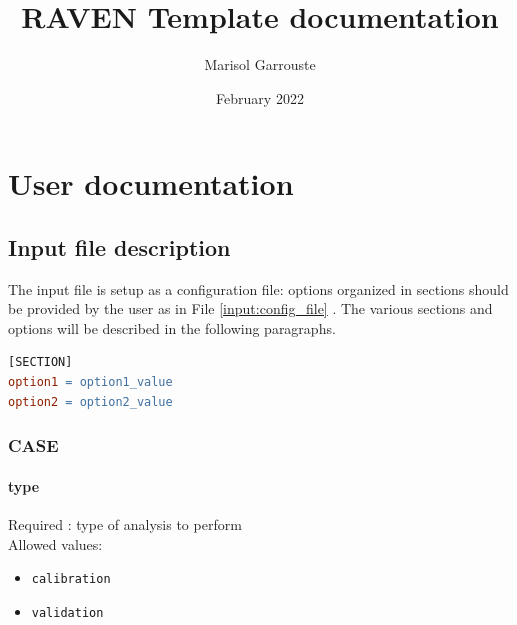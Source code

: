 \documentclass[oneside]{book}
\title{RAVEN Template documentation}
\author{Marisol Garrouste}
\date{February 2022}
\begin{document}
\maketitle

\newpage
\chapter{User documentation}
\section{Input file description}





The input file is setup as a configuration file: options organized in sections should be provided by the user as in File \ref{input:config_file} . 
The various sections and options will be described in the following paragraphs. 
\begin{lstlisting}[language=make,caption={Configuration file format}, label={input:config_file}]
[SECTION]
option1 = option1_value  
option2 = option2_value
\end{lstlisting}

\FloatBarrier

\subsection{CASE}

\subsubsection{type} Required : type of analysis to perform
\\Allowed values: 
\begin{itemize}
    \item \verb|calibration|
    \item \verb|validation|
\end{itemize}
\end{document}
